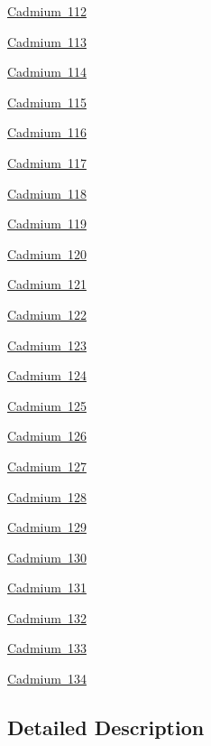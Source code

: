 \begin{DoxyCompactItemize}
\item 
\mbox{\hyperlink{group___isotope_const-_cadmium-_cd112}{Cadmium 112}}
\item 
\mbox{\hyperlink{group___isotope_const-_cadmium-_cd113}{Cadmium 113}}
\item 
\mbox{\hyperlink{group___isotope_const-_cadmium-_cd114}{Cadmium 114}}
\item 
\mbox{\hyperlink{group___isotope_const-_cadmium-_cd115}{Cadmium 115}}
\item 
\mbox{\hyperlink{group___isotope_const-_cadmium-_cd116}{Cadmium 116}}
\item 
\mbox{\hyperlink{group___isotope_const-_cadmium-_cd117}{Cadmium 117}}
\item 
\mbox{\hyperlink{group___isotope_const-_cadmium-_cd118}{Cadmium 118}}
\item 
\mbox{\hyperlink{group___isotope_const-_cadmium-_cd119}{Cadmium 119}}
\item 
\mbox{\hyperlink{group___isotope_const-_cadmium-_cd120}{Cadmium 120}}
\item 
\mbox{\hyperlink{group___isotope_const-_cadmium-_cd121}{Cadmium 121}}
\item 
\mbox{\hyperlink{group___isotope_const-_cadmium-_cd122}{Cadmium 122}}
\item 
\mbox{\hyperlink{group___isotope_const-_cadmium-_cd123}{Cadmium 123}}
\item 
\mbox{\hyperlink{group___isotope_const-_cadmium-_cd124}{Cadmium 124}}
\item 
\mbox{\hyperlink{group___isotope_const-_cadmium-_cd125}{Cadmium 125}}
\item 
\mbox{\hyperlink{group___isotope_const-_cadmium-_cd126}{Cadmium 126}}
\item 
\mbox{\hyperlink{group___isotope_const-_cadmium-_cd127}{Cadmium 127}}
\item 
\mbox{\hyperlink{group___isotope_const-_cadmium-_cd128}{Cadmium 128}}
\item 
\mbox{\hyperlink{group___isotope_const-_cadmium-_cd129}{Cadmium 129}}
\item 
\mbox{\hyperlink{group___isotope_const-_cadmium-_cd130}{Cadmium 130}}
\item 
\mbox{\hyperlink{group___isotope_const-_cadmium-_cd131}{Cadmium 131}}
\item 
\mbox{\hyperlink{group___isotope_const-_cadmium-_cd132}{Cadmium 132}}
\item 
\mbox{\hyperlink{group___isotope_const-_cadmium-_cd133}{Cadmium 133}}
\item 
\mbox{\hyperlink{group___isotope_const-_cadmium-_cd134}{Cadmium 134}}
\end{DoxyCompactItemize}


\subsection{Detailed Description}
